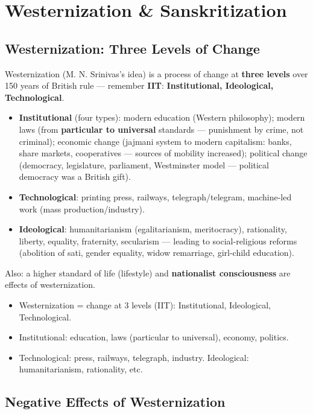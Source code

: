 \chapter{Westernization \& Sanskritization}

\section{Westernization: Three Levels of Change}

Westernization (M. N. Srinivas's idea) is a process of change at \textbf{three levels} over 150 years of British rule --- remember \textbf{IIT}: \textbf{Institutional, Ideological, Technological}.
\begin{itemize}
\item \textbf{Institutional} (four types): modern education (Western philosophy); modern laws (from \textbf{particular to universal} standards --- punishment by crime, not criminal); economic change (jajmani system to modern capitalism: banks, share markets, cooperatives --- sources of mobility increased); political change (democracy, legislature, parliament, Westminster model --- political democracy was a British gift).
\item \textbf{Technological}: printing press, railways, telegraph/telegram, machine-led work (mass production/industry).
\item \textbf{Ideological}: humanitarianism (egalitarianism, meritocracy), rationality, liberty, equality, fraternity, secularism --- leading to social-religious reforms (abolition of sati, gender equality, widow remarriage, girl-child education).
\end{itemize}

Also: a higher standard of life (lifestyle) and \textbf{nationalist consciousness} are effects of westernization.

\begin{QuickRevision}
\begin{itemize}
\item Westernization = change at 3 levels (IIT): Institutional, Ideological, Technological.
\item Institutional: education, laws (particular to universal), economy, politics.
\item Technological: press, railways, telegraph, industry. Ideological: humanitarianism, rationality, etc.
\end{itemize}
\end{QuickRevision}

\section{Negative Effects of Westernization}

